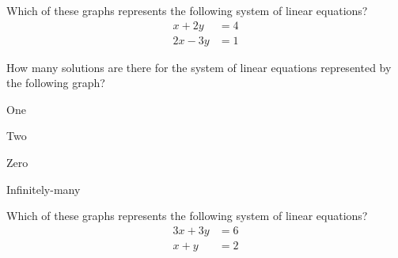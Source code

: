 \documentclass{article}
\begin{document}
\begin{readinessAssuranceTest}
\item Which of these graphs represents the following system of linear equations?
      \begin{align*}
      x+2y   &=   4 \\
      2x-3y  &=  1
      \end{align*}

\begin{multicols}{4}
\begin{readinessAssuranceTestChoices}
\item \systemWithInfinitelyManySolutions
\item \systemWithNoSolutions
\item \systemWithOneSolutionA %
\item \systemWithOneSolutionB
\end{readinessAssuranceTestChoices}
\end{multicols}


\item How many solutions are there for the system of linear equations
      represented by the following graph?
    \begin{center}
      \systemWithOneSolutionB
    \end{center}

\begin{multicols}{4}
\begin{readinessAssuranceTestChoices}
\item One %
\item Two
\item Zero
\item Infinitely-many
\end{readinessAssuranceTestChoices}
\end{multicols}

\item Which of these graphs represents the following system of linear equations?
      \begin{align*}
      3x+3y   &=   6 \\
      x+y  &=  2
      \end{align*}

\begin{multicols}{4}
\begin{readinessAssuranceTestChoices}
\item \systemWithOneSolutionA
\item \systemWithOneSolutionB
\item \systemWithNoSolutions
\item \systemWithInfinitelyManySolutions %
\end{readinessAssuranceTestChoices}
\end{multicols}




\end{readinessAssuranceTest}
\end{document}
